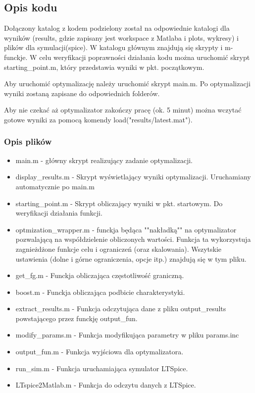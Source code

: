 \documentclass{article}
\begin{document}
\subsection{Opis kodu}
Dołączony katalog z kodem podzielony został na odpowiednie katalogi dla wyników (results, gdzie zapisany jest workspace z Matlaba i plots, wykresy) i plików dla symulacji(spice).
W katalogu głównym znajdują się skrypty i m-funckje. W celu weryfikacji poprawności działania kodu można uruchomić skrypt starting\_point.m, który przedstawia wyniki w pkt. początkowym.

Aby uruchomić optymalizację należy uruchomić skrypt main.m. Po optymalizacji wyniki zostaną zapisane do odpowiednich folderów.

Aby nie czekać aż optymalizator zakończy pracę (ok. 5 minut) można wczytać gotowe wyniki za pomocą komendy load("results/latest.mat").

\subsubsection*{Opis plików}
\begin{itemize}
	\item main.m - główny skrypt realizujący zadanie optymalizacji.
	\item display\_results.m - Skrypt wyświetlający wyniki optymalizacji. Uruchamiany automatycznie po main.m
	\item starting\_point.m - Skrypt obliczający wyniki w pkt. startowym. Do weryfikacji działania funkcji.
	\item optmization\_wrapper.m - funckja będąca ""nakładką"" na optymalizator pozwalającą na współdzielenie
obliczonych wartości. Funkcja ta wykorzystuja zagnieżdżone funkcje celu i ograniczeń (oraz skalowania). Wszytskie ustawienia (dolne i górne ograniczenia, opcje itp.) znajdują się w tym pliku.
	\item get\_fg.m - Funckja obliczająca częstotliwość graniczną.
	\item boost.m - Funckja obliczająca podbicie charakterystyki.
	\item extract\_results.m - Funkcja odczytująca dane z pliku output\_results powstającego przez funckję output\_fun.
	\item modify\_params.m - Funkcja modyfikująca parametry w pliku params.inc
	\item output\_fun.m - Funkcja wyjściowa dla optymalizatora.
	\item run\_sim.m - Funkcja uruchamiająca symulator LTSpice.
	\item LTspice2Matlab.m - Funkcja do odczytu danych z LTSpice.
\end{itemize}
\end{document}

